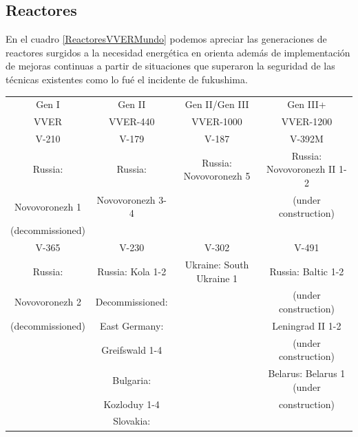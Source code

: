 \documentclass[]{article}
\begin{document}
\subsection{Reactores}

En el cuadro \ref{ReactoresVVERMundo} podemos apreciar las generaciones de reactores surgidos a la necesidad energética en orienta además de implementación de mejoras continuas a partir de situaciones que superaron la seguridad de las técnicas existentes como lo fué el incidente de fukushima.\\

\begin{table}[h!]
	\centering
	\begin{tabular}{||c|c|c|c||}
		\hline
		Gen I            & Gen II               & Gen II/Gen III           & Gen III+                    \\
		VVER             & VVER-440             & VVER-1000                & VVER-1200                   \\
		V-210            & V-179                & V-187                    & V-392M                      \\ \hline\hline
		Russia:          & Russia:              & Russia: Novovoronezh 5   & Russia: Novovoronezh II 1-2 \\
		Novovoronezh 1   & Novovoronezh 3-4     &                          & (under construction)        \\
		(decommissioned) &                      &                          &                             \\ \hline
		V-365            & V-230                & V-302                    & V-491                       \\
		Russia:          & Russia: Kola 1-2     & Ukraine: South Ukraine 1 & Russia: Baltic 1-2          \\
		Novovoronezh 2   & Decommissioned:      &                          & (under construction)        \\
		(decommissioned) & East Germany:        &                          & Leningrad II 1-2            \\
		& Greifswald 1-4       &                          & (under construction)        \\
		& Bulgaria:            &                          & Belarus: Belarus 1 (under   \\
		& Kozloduy 1-4         &                          & construction)               \\
		& Slovakia:            &                          &                             \\

\end{tabular}
\end{table}
\end{document}
